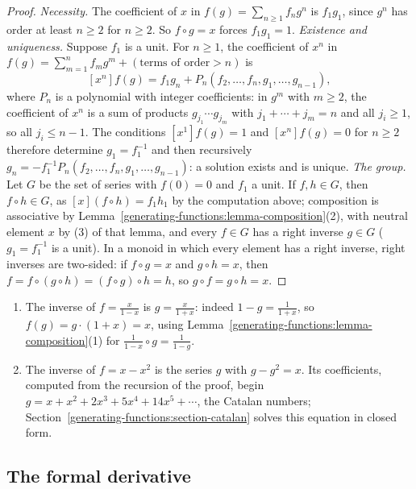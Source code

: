 \begin{proof}
\emph{Necessity.} The coefficient of $x$ in $f(g) = \sum_{n \geq 1}f_ng^n$ is $f_1g_1$, since $g^n$ has order at least $n \geq 2$ for $n \geq 2$. So $f \circ g = x$ forces $f_1g_1 = 1$.
\emph{Existence and uniqueness.} Suppose $f_1$ is a unit. For $n \geq 1$, the coefficient of $x^n$ in $f(g) = \sum_{m=1}^{n}f_mg^m + (\text{terms of order} > n)$ is
\[
[x^n]f(g) = f_1g_n + P_n(f_2, \ldots, f_n, g_1, \ldots, g_{n-1}),
\]
where $P_n$ is a polynomial with integer coefficients: in $g^m$ with $m \geq 2$, the coefficient of $x^n$ is a sum of products $g_{j_1} \cdots g_{j_m}$ with $j_1 + \cdots + j_m = n$ and all
$j_i \geq 1$, so all $j_i \leq n - 1$. The conditions $[x^1]f(g) = 1$ and $[x^n]f(g) = 0$ for $n \geq 2$ therefore determine $g_1 = f_1^{-1}$ and then recursively
$g_n = -f_1^{-1}P_n(f_2, \ldots, f_n, g_1, \ldots, g_{n-1})$: a solution exists and is unique.
\emph{The group.} Let $G$ be the set of series with $f(0) = 0$ and $f_1$ a unit. If $f, h \in G$, then $f \circ h \in G$, as $[x](f \circ h) = f_1h_1$ by the computation above; composition is associative
by Lemma~\ref{generating-functions:lemma-composition}(2), with neutral element $x$ by (3) of that lemma, and every $f \in G$ has a right inverse $g \in G$ ($g_1 = f_1^{-1}$ is a unit). In a monoid
in which every element has a right inverse, right inverses are two-sided: if $f \circ g = x$ and $g \circ h = x$, then $f = f \circ (g \circ h) = (f \circ g) \circ h = h$, so $g \circ f = g \circ h = x$.
\end{proof}

\begin{example}\label{generating-functions:example-compositional-inverse}
\begin{enumerate}
\item The inverse of $f = \frac{x}{1 - x}$ is $g = \frac{x}{1 + x}$: indeed $1 - g = \frac{1}{1 + x}$, so $f(g) = g \cdot (1 + x) = x$, using Lemma~\ref{generating-functions:lemma-composition}(1)
for $\frac{1}{1 - x} \circ g = \frac{1}{1 - g}$.
\item The inverse of $f = x - x^2$ is the series $g$ with $g - g^2 = x$. Its coefficients, computed from the recursion of the proof, begin $g = x + x^2 + 2x^3 + 5x^4 + 14x^5 + \cdots$, the Catalan
numbers; Section~\ref{generating-functions:section-catalan} solves this equation in closed form.
\end{enumerate}
\end{example}

\subsection{The formal derivative}\label{generating-functions:subsection-derivative}

